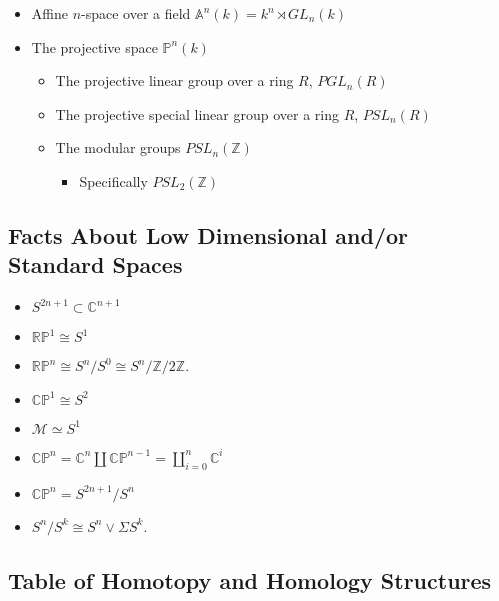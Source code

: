 \begin{itemize}
  \begin{itemize}
  \tightlist
  \item
    Affine \(n\)-space over a field
    \({\mathbb{A}}^n(k) = k^n \rtimes GL_n(k)\)
  \item
    The projective space \({\mathbb{P}}^n(k)\)

    \begin{itemize}
    \tightlist
    \item
      The projective linear group over a ring \(R\), \(PGL_n(R)\)
    \item
      The projective special linear group over a ring \(R\),
      \(PSL_n(R)\)
    \item
      The modular groups \(PSL_n({\mathbb{Z}})\)

      \begin{itemize}
      \tightlist
      \item
        Specifically \(PSL_2({\mathbb{Z}})\)
      \end{itemize}
    \end{itemize}
  \end{itemize}
\end{itemize}

\hypertarget{facts-about-low-dimensional-andor-standard-spaces}{%
\subsection{Facts About Low Dimensional and/or Standard
Spaces}\label{facts-about-low-dimensional-andor-standard-spaces}}

\begin{itemize}
\tightlist
\item
  \(S^{2n+1} \subset {\mathbb{C}}^{n+1}\)
\item
  \({\mathbb{RP}}^1 \cong S^1\)
\item
  \({\mathbb{RP}}^n \cong S^n/S^0 \cong S^n / {\mathbb{Z}}/2{\mathbb{Z}}\).
\item
  \({\mathbb{CP}}^1 \cong S^2\)
\item
  \({\mathcal{M}}\simeq S^1\)
\item
  \({\mathbb{CP}}^n = {\mathbb{C}}^n \coprod {\mathbb{CP}}^{n-1} = \coprod_{i=0}^n {\mathbb{C}}^i\)
\item
  \({\mathbb{CP}}^n = S^{2n+1} / S^n\)
\item
  \(S^n/S^k \cong S^n \vee \Sigma S^k\).
\end{itemize}

\hypertarget{table-of-homotopy-and-homology-structures}{%
\subsection{Table of Homotopy and Homology
Structures}\label{table-of-homotopy-and-homology-structures}}

